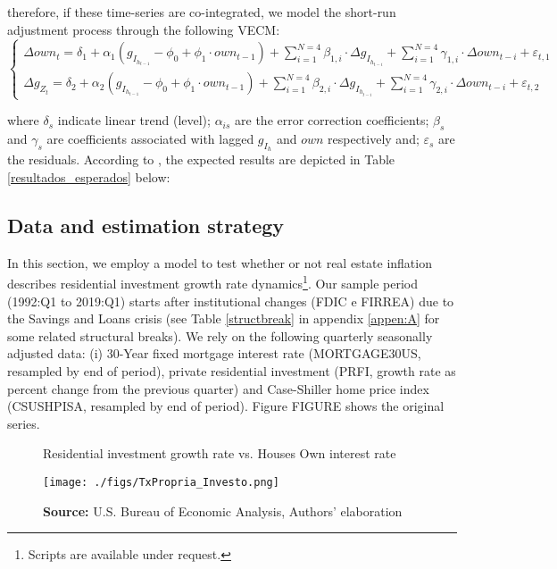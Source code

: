 \documentclass[11pt]{article}
\begin{document}
therefore, if these time-series are co-integrated, we model the short-run adjustment process through the following VECM:
\begin{equation}
\begin{cases}
\Delta own_t = \delta_{1} + \alpha_1\left(g_{I_{h_{t-1}}} - \phi_0 + \phi_1\cdot own_{t-1}\right) + {\sum^{N=4}_{i=1}}\beta_{1,i}\cdot \Delta g_{I_{h_{t-i}}} +
\sum^{N=4}_{i=1}\gamma_{1,i}\cdot \Delta own_{t-i} +\varepsilon_{t,1}
\\
\Delta g_{Z_{t}} = \delta_{2} + \alpha_2\left(g_{I_{h_{t-1}}} - \phi_0 + \phi_1\cdot own_{t-1}\right) + \sum^{N=4}_{i=1}\beta_{2,i}\cdot \Delta g_{I_{h_{t-i}}} +
\sum^{N=4}_{i=1}\gamma_{2,i}\cdot \Delta own_{t-i} +\varepsilon_{t,2}
\end{cases}
\end{equation}

where \(\delta_s\) indicate linear trend (level);
\(\alpha_{is}\) are the error correction coefficients; 
\(\beta_s\) and \(\gamma_s\) are coefficients associated with lagged \(g_{I_h}\) and \(own\) respectively and; \(\varepsilon_s\) are the residuals.
According to \textcite{teixeira_crescimento_2015}, the expected results are depicted in Table \ref{resultados_esperados} below:



\subsection{Data and estimation strategy}
\label{sec:orgbf25493}
\label{sec:estimation}


In this section, we employ a model to test whether or not real estate inflation describes residential investment growth rate dynamics\footnote{Scripts are available under request.}.
Our sample period (1992:Q1 to 2019:Q1) starts after institutional changes (FDIC e
FIRREA) due to the Savings and Loans crisis (see Table \ref{structbreak} in appendix \ref{appen:A} for some related structural breaks). 
We rely on the following  quarterly seasonally adjusted data: (i) 30-Year fixed mortgage interest rate (MORTGAGE30US, resampled by end of period), private residential investment (PRFI, growth rate as percent change from the previous quarter) and Case-Shiller home price index
(CSUSHPISA, resampled by end of period). Figure FIGURE shows the original series.

\begin{figure}[htb]
	\centering
	\caption{Residential investment growth rate vs. Houses Own interest rate}
	\label{propria_investo}
	\texttt{[image: ./figs/TxPropria\_Investo.png]}
	\caption*{\textbf{Source:} U.S. Bureau of Economic Analysis, Authors' elaboration}
\end{figure}
\end{document}

